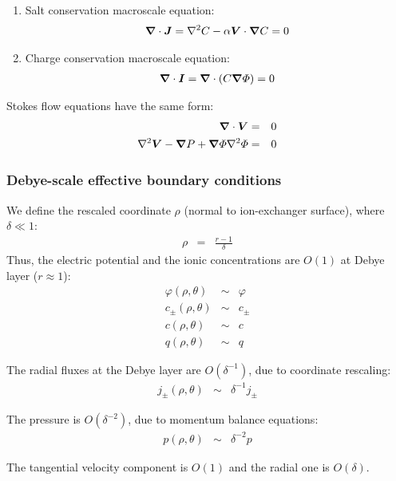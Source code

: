 \begin{enumerate}
\item Salt conservation macroscale equation:
\begin{eqnarray}
\boldsymbol{\nabla} \cdot \boldsymbol{J} = \nabla^2 C - \alpha \boldsymbol{V} \cdot \boldsymbol{\nabla} C = 0 
\end{eqnarray}

\item Charge conservation macroscale equation:
\begin{eqnarray}
\boldsymbol{\nabla} \cdot \boldsymbol{I} = \boldsymbol{\nabla} \cdot \left( C \boldsymbol{\nabla} \varPhi \right) = 0
\end{eqnarray}
\end{enumerate}

Stokes flow equations have the same form:
\begin{eqnarray}
\boldsymbol{\nabla} \cdot \boldsymbol{V} &=& 0 \\
\nabla^2 \boldsymbol{V} - \boldsymbol{\nabla} P + \boldsymbol{\nabla} \varPhi \nabla^2 \varPhi &=& 0
\end{eqnarray}

\subsubsection{Debye-scale effective boundary conditions}
We define the rescaled coordinate $\rho$ (normal to ion-exchanger surface), where $\delta \ll 1$:
\begin{eqnarray}
  \rho &=& \frac{r-1}{\delta} 
\end{eqnarray}
Thus, the electric potential and the ionic concentrations are $O(1)$ at Debye layer ($r \approx 1$):
\begin{eqnarray}
  \varphi(\rho,\theta) &\sim& \varphi \\
  c_\pm(\rho,\theta) &\sim& c_\pm \\
  c(\rho,\theta) &\sim& c \\
  q(\rho,\theta) &\sim& q
\end{eqnarray}

The radial fluxes at the Debye layer are $O(\delta^{-1})$, due to coordinate rescaling:
\begin{eqnarray}
  j_\pm(\rho, \theta) &\sim& \delta^{-1} j_\pm
\end{eqnarray}

The pressure is $O(\delta^{-2})$, due to momentum balance equations:
\begin{eqnarray}
  p(\rho, \theta) &\sim& \delta^{-2} p
\end{eqnarray}

The tangential velocity component is $O(1)$ and the radial one is $O(\delta)$.

